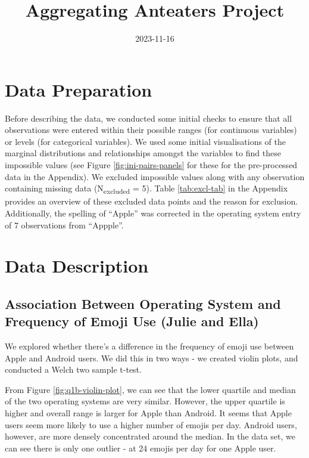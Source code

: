 \documentclass[
]{article}
\title{Aggregating Anteaters Project}
\author{}
\date{\vspace{-2.5em}2023-11-16}
\begin{document}
\maketitle

{
\setcounter{tocdepth}{2}
\tableofcontents
}
\hypertarget{data-preparation}{%
\section{Data Preparation}\label{data-preparation}}

Before describing the data, we conducted some initial checks to ensure that all observations were entered within their possible ranges (for continuous variables) or levels (for categorical variables). We used some initial visualisations of the marginal distributions and relationships amongst the variables to find these impossible values (see Figure \ref{fig:ini-pairs-panels} for these for the pre-processed data in the Appendix). We excluded impossible values along with any observation containing missing data (N\textsubscript{excluded} = 5). Table \ref{tab:excl-tab} in the Appendix provides an overview of these excluded data points and the reason for exclusion. Additionally, the spelling of ``Apple'' was corrected in the operating system entry of 7 observations from ``Appple''.

\hypertarget{data-description}{%
\section{Data Description}\label{data-description}}

\hypertarget{association-between-operating-system-and-frequency-of-emoji-use-julie-and-ella}{%
\subsection{Association Between Operating System and Frequency of Emoji Use (Julie and Ella)}\label{association-between-operating-system-and-frequency-of-emoji-use-julie-and-ella}}

We explored whether there's a difference in the frequency of emoji use between Apple and Android users. We did this in two ways - we created violin plots, and conducted a Welch two sample t-test.

From Figure \ref{fig:q1b-violin-plot}, we can see that the lower quartile and median of the two operating systems are very similar. However, the upper quartile is higher and overall range is larger for Apple than Android. It seems that Apple users seem more likely to use a higher number of emojis per day. Android users, however, are more densely concentrated around the median. In the data set, we can see there is only one outlier - at 24 emojis per day for one Apple user.
\end{document}
